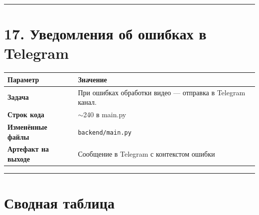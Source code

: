 \documentclass[12pt,a4paper]{article}
\begin{document}
\vspace{1em}
\hrule
\vspace{1em}

\section{17. Уведомления об ошибках в Telegram}

\begin{tabular}{>{\bfseries}l p{10cm}}
\toprule
Параметр & Значение \\
\midrule
Задача & При ошибках обработки видео — отправка в Telegram канал. \\
Строк кода & $\sim$240 в main.py \\
Изменённые файлы & \texttt{backend/main.py} \\
Артефакт на выходе & Сообщение в Telegram с контекстом ошибки \\
\bottomrule
\end{tabular}

\vspace{2em}
\hrule
\vspace{1em}

\section*{Сводная таблица}
\end{document}
